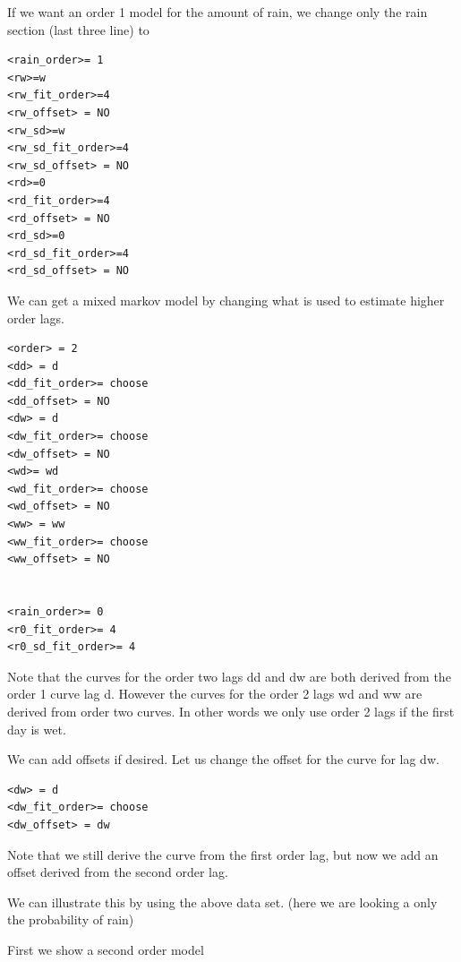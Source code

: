 \documentclass{article}
\begin{document}
If we want an order 1 model for the amount of rain, we change only
the rain section (last three line) to 

\begin{verbatim}
<rain_order>= 1
<rw>=w
<rw_fit_order>=4
<rw_offset> = NO
<rw_sd>=w
<rw_sd_fit_order>=4
<rw_sd_offset> = NO
<rd>=0
<rd_fit_order>=4
<rd_offset> = NO
<rd_sd>=0
<rd_sd_fit_order>=4
<rd_sd_offset> = NO
\end{verbatim}

We can get a mixed markov model by  changing what is used to estimate
higher order lags.

\begin{verbatim}
<order> = 2
<dd> = d  
<dd_fit_order>= choose
<dd_offset> = NO
<dw> = d
<dw_fit_order>= choose
<dw_offset> = NO
<wd>= wd
<wd_fit_order>= choose
<wd_offset> = NO
<ww> = ww
<ww_fit_order>= choose
<ww_offset> = NO


<rain_order>= 0
<r0_fit_order>= 4
<r0_sd_fit_order>= 4
\end{verbatim}

Note that the curves for the order two lags dd and dw are both derived 
from the order 1 curve lag d.  However the curves for the order 2
lags wd and ww are derived from order two curves.  In other words we only
use order 2 lags if the first day is wet.

We can add offsets if desired.  Let us change the offset for the curve
for lag dw.

\begin{verbatim}
<dw> = d
<dw_fit_order>= choose
<dw_offset> = dw
\end{verbatim}

Note that we still derive the curve from the first order lag,
but now we add an offset derived from the second order lag.

We can illustrate this by using the above data set.
(here we are looking a only the probability of rain)

First we show a second order model
\end{document}

